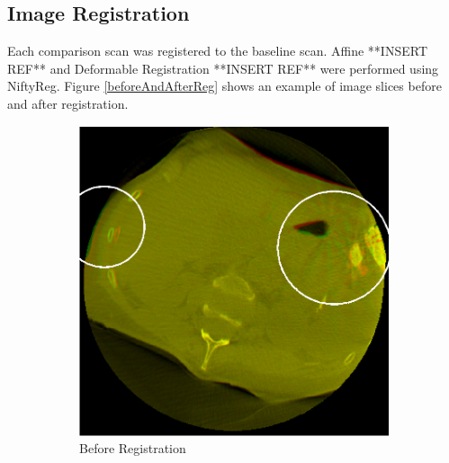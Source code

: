 \documentclass[]{spie}  %
\begin{document}
\subsection{Image Registration} 

Each comparison scan was registered to the baseline scan. Affine **INSERT REF** and Deformable Registration **INSERT REF** were performed using NiftyReg. Figure \ref{beforeAndAfterReg} shows an example of image slices before and after registration. 

\begin{figure} 
\centering 
\begin{subfigure}[t]{0.45\textwidth} 
\includegraphics[width=\textwidth]{unregisteredSlice.png}
\caption{Before Registration} 
\label{unregSlice} 
\end{subfigure} 
\begin{subfigure}[t]{0.45\textwidth} 

\end{subfigure}
\end{figure}
\end{document}
